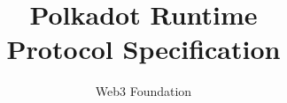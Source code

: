 \documentclass[11pt,a4paper]{book}
\begin{document}
\title{
  {\Huge Polkadot Runtime}\\
  {\Large Protocol Specification}
}
\author{Web3 Foundation}

\date{}

\maketitle

\tableofcontents
\newpage





%

\begin{appendix}
\end{appendix}
\end{document}
